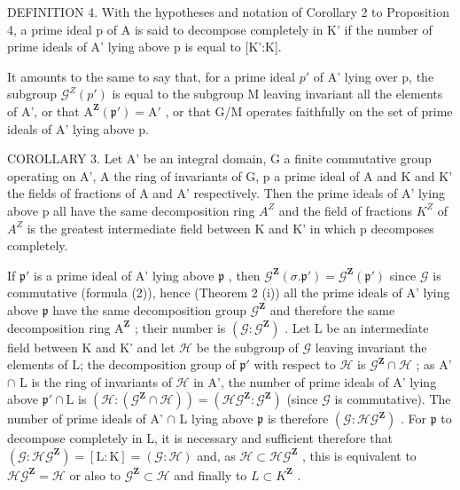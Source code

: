 DEFINITION 4. With the hypotheses and notation of Corollary 2 to Proposition 4, a prime ideal p of A is said to decompose completely in K' if the number of prime ideals of A' lying above p is equal to [K':K].

It amounts to the same to say that, for a prime ideal \(p'\) of A' lying over p, the subgroup \(\mathcal{G}^{Z}(p')\) is equal to the subgroup M leaving invariant all the elements of A', or that \(\mathrm{A}^{\mathbf{Z}}(\mathfrak{p}') = \mathrm{A}'\) , or that G/M operates faithfully on the set of prime ideals of A' lying above p.

COROLLARY 3. Let A' be an integral domain, G a finite commutative group operating on A', A the ring of invariants of G, p a prime ideal of A and K and K' the fields of fractions of A and A' respectively. Then the prime ideals of A' lying above p all have the same decomposition ring \(A^{Z}\) and the field of fractions \(K^{Z}\) of \(A^{Z}\) is the greatest intermediate field between K and K' in which p decomposes completely.

If \(\mathfrak{p}'\) is a prime ideal of A' lying above \(\mathfrak{p}\) , then \(\mathcal{G}^{\mathbf{Z}}(\sigma. \mathfrak{p}') = \mathcal{G}^{\mathbf{Z}}(\mathfrak{p}')\) since \(\mathcal{G}\) is commutative (formula (2)), hence (Theorem 2 (i)) all the prime ideals of A' lying above \(\mathfrak{p}\) have the same decomposition group \(\mathcal{G}^{\mathbf{Z}}\) and therefore the same decomposition ring \(\mathrm{A}^{\mathbf{Z}}\) ; their number is \((\mathcal{G}: \mathcal{G}^{\mathbf{Z}})\) . Let L be an intermediate field between K and K' and let \(\mathcal{H}\) be the subgroup of \(\mathcal{G}\) leaving invariant the elements of L; the decomposition group of \(\mathfrak{p}'\) with respect to \(\mathcal{H}\) is \(\mathcal{G}^{\mathbf{Z}} \cap \mathcal{H}\) ; as A' \(\cap\) L is the ring of invariants of \(\mathcal{H}\) in A', the number of prime ideals of A' lying above \(\mathfrak{p}' \cap \mathrm{L}\) is \((\mathcal{H}: (\mathcal{G}^{\mathbf{Z}} \cap \mathcal{H})) = (\mathcal{H}\mathcal{G}^{\mathbf{Z}}: \mathcal{G}^{\mathbf{Z}})\) (since \(\mathcal{G}\) is commutative). The number of prime ideals of A' \(\cap\) L lying above \(\mathfrak{p}\) is therefore \((\mathcal{G}: \mathcal{H}\mathcal{G}^{\mathbf{Z}})\) . For \(\mathfrak{p}\) to decompose completely in L, it is necessary and sufficient therefore that \((\mathcal{G}: \mathcal{H}\mathcal{G}^{\mathbf{Z}}) = [\mathrm{L}: \mathrm{K}] = (\mathcal{G}: \mathcal{H})\) and, as \(\mathcal{H} \subset \mathcal{H}\mathcal{G}^{\mathbf{Z}}\) , this is equivalent to \(\mathcal{H}\mathcal{G}^{\mathbf{Z}} = \mathcal{H}\) or also to \(\mathcal{G}^{\mathbf{Z}} \subset \mathcal{H}\) and finally to \(L \subset K^{\mathbf{Z}}\) .

